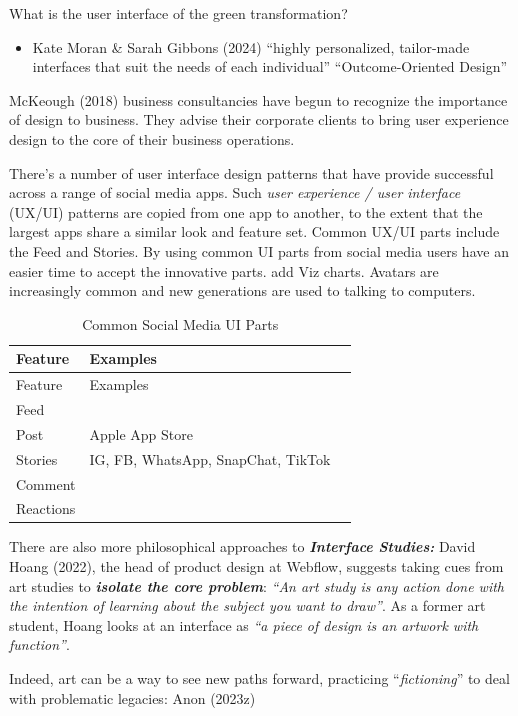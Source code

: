 \documentclass[
  letterpaper,
  DIV=11,
  numbers=noendperiod]{scrartcl}
\providecommand{\tightlist}{%
  \setlength{\itemsep}{0pt}\setlength{\parskip}{0pt}}\usepackage{longtable,booktabs,array}
\begin{document}
What is the user interface of the green transformation?

\begin{itemize}
\tightlist
\item
  Kate Moran \& Sarah Gibbons (2024) ``highly personalized, tailor-made
  interfaces that suit the needs of each individual'' ``Outcome-Oriented
  Design''
\end{itemize}

McKeough (2018) business consultancies have begun to recognize the
importance of design to business. They advise their corporate clients to
bring user experience design to the core of their business operations.

There's a number of user interface design patterns that have provide
successful across a range of social media apps. Such \emph{user
experience / user interface} (UX/UI) patterns are copied from one app to
another, to the extent that the largest apps share a similar look and
feature set. Common UX/UI parts include the Feed and Stories. By using
common UI parts from social media users have an easier time to accept
the innovative parts. add Viz charts. Avatars are increasingly common
and new generations are used to talking to computers.

\begin{longtable}[]{@{}lll@{}}
\caption{Common Social Media UI Parts}\tabularnewline
\toprule\noalign{}
Feature & Examples & \\
\midrule\noalign{}
\endfirsthead
\toprule\noalign{}
Feature & Examples & \\
\midrule\noalign{}
\endhead
\bottomrule\noalign{}
\endlastfoot
Feed & & \\
Post & Apple App Store & \\
Stories & IG, FB, WhatsApp, SnapChat, TikTok & \\
Comment & & \\
Reactions & & \\
\end{longtable}

There are also more philosophical approaches to \textbf{\emph{Interface
Studies:}} David Hoang (2022), the head of product design at Webflow,
suggests taking cues from art studies to \textbf{\emph{isolate the core
problem}}: \emph{``An art study is any action done with the intention of
learning about the subject you want to draw''}. As a former art student,
Hoang looks at an interface as \emph{``a piece of design is an artwork
with function''}.

Indeed, art can be a way to see new paths forward, practicing
``\emph{fictioning}'' to deal with problematic legacies: Anon (2023z)
\end{document}
